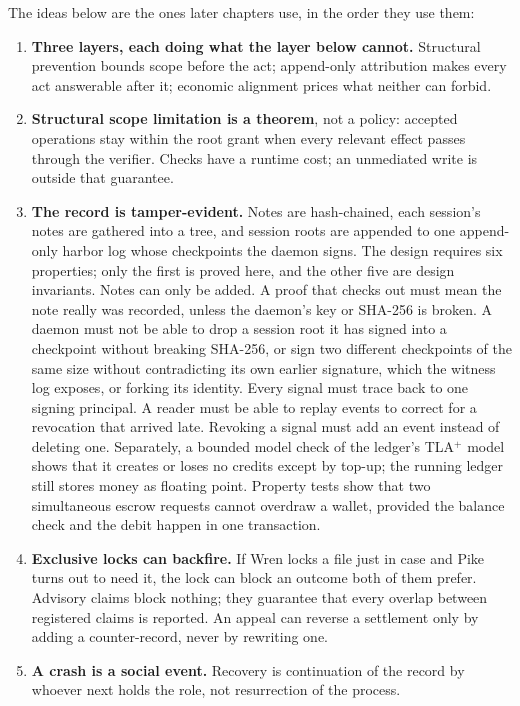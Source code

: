 \documentclass[11pt,a4paper]{article}
\theoremstyle{definition}
\theoremstyle{remark}
\begin{document}
The ideas below are the ones later chapters use, in the order they use them:

\begin{enumerate}[leftmargin=1.6em,itemsep=2pt]
\item \textbf{Three layers, each doing what the layer below cannot.} Structural prevention bounds scope before the act; append-only attribution makes every act answerable after it; economic alignment prices what neither can forbid.
\item \textbf{Structural scope limitation is a theorem}, not a policy: accepted operations stay within the root grant when every relevant effect
passes through the verifier. Checks have a runtime cost; an unmediated write
is outside that guarantee.
\item \textbf{The record is tamper-evident.} Notes are hash-chained, each session's notes are gathered into a tree, and session roots are appended to one append-only harbor log whose checkpoints the daemon signs. The design requires six properties; only the first is proved here, and the other five are design invariants. Notes can only be added. A proof that checks out must mean the note really was recorded, unless the daemon's key or SHA-256 is broken. A daemon must not be able to drop a session root it has signed into a checkpoint without breaking SHA-256, or sign two different checkpoints of the same size without contradicting its own earlier signature, which the witness log exposes, or forking its identity. Every signal must trace back to one signing principal. A reader must be able to replay events to correct for a revocation that arrived late. Revoking a signal must add an event instead of deleting one. Separately, a bounded model check of the ledger's TLA$^{+}$ model shows that it creates or loses no credits except by top-up; the running ledger still stores money as floating point. Property tests show that two simultaneous escrow requests cannot overdraw a wallet, provided the balance check and the debit happen in one transaction.
\item \textbf{Exclusive locks can backfire.} If Wren locks a file just in case and Pike turns out to need it, the lock can block an outcome both of them prefer. Advisory claims block nothing; they guarantee that every overlap between registered claims is reported. An appeal can reverse a settlement only by adding a counter-record, never by rewriting one.
\item \textbf{A crash is a social event.} Recovery is continuation of the record by whoever next holds the role, not resurrection of the process.

\end{enumerate}
\end{document}
